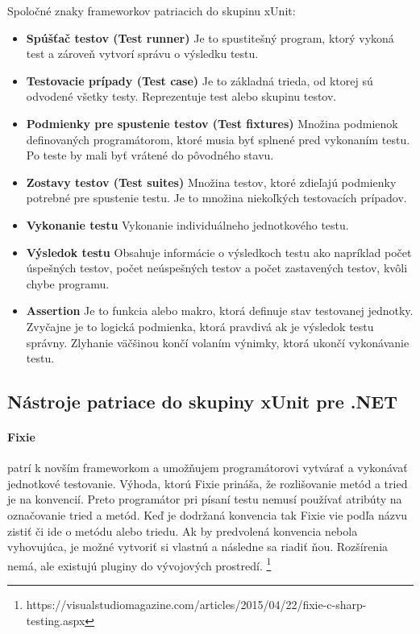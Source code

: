 \documentclass[11pt,twoside,slovak,a4paper]{article}
\begin{document}
		Spoločné znaky frameworkov patriacich do skupinu xUnit:
		\begin{itemize}
			\item \textbf{Spúšťač testov (Test runner)} Je to spustitešný program, ktorý vykoná test a zároveň vytvorí správu o výsledku testu.
			\item \textbf{Testovacie prípady (Test case)} Je to základná trieda, od ktorej sú odvodené všetky testy. Reprezentuje test alebo skupinu testov.
			\item \textbf{Podmienky pre spustenie testov (Test fixtures)} Množina podmienok definovaných programátorom, ktoré musia byť splnené pred vykonaním testu. Po teste by mali byť vrátené do pôvodného stavu.
			\item \textbf{Zostavy testov (Test suites)} Množina testov, ktoré zdieľajú podmienky potrebné pre spustenie testu. Je to množina niekoľkých testovacích prípadov.
			\item \textbf{Vykonanie testu} Vykonanie individuálneho jednotkového testu.
			\item \textbf{Výsledok testu} Obsahuje informácie o výsledkoch testu ako napríklad počet úspešných testov, počet neúspešných testov a počet zastavených testov, kvôli chybe programu.
			\item \textbf{Assertion} Je to funkcia alebo makro, ktorá definuje stav testovanej jednotky. Zvyčajne je to logická podmienka, ktorá pravdivá ak je výsledok testu správny. Zlyhanie väčšinou končí volaním výnimky, ktorá ukončí vykonávanie testu. \cite{Brauer}
		\end{itemize}
		
		\subsection{Nástroje patriace do skupiny xUnit pre .NET}
			
			\paragraph{Fixie} patrí k novším frameworkom a umožňujem programátorovi vytvárať a vykonávať jednotkové testovanie. Výhoda, ktorú Fixie prináša, že rozlišovanie metód a tried je na konvencií. Preto programátor pri písaní testu nemusí používať atribúty na označovanie tried a metód. Keď je dodržaná konvencia tak Fixie vie podľa názvu zistiť či ide o metódu alebo triedu. Ak by predvolená konvencia nebola vyhovujúca, je možné vytvoriť si vlastnú a následne sa riadiť ňou. Rozšírenia nemá, ale existujú pluginy do vývojových prostredí.  \footnote{https://visualstudiomagazine.com/articles/2015/04/22/fixie-c-sharp-testing.aspx}
			
\end{document}
